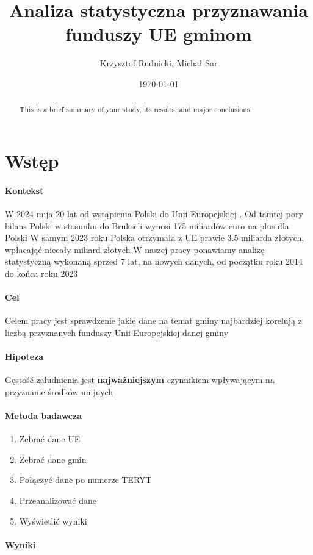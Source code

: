 \documentclass[12pt]{article}
\title{Analiza statystyczna przyznawania funduszy UE gminom}
\author{Krzysztof Rudnicki, Michał Sar}
\date{\today}
\begin{document}
\maketitle

\tableofcontents

\begin{abstract}
    This is a brief summary of your study, its results, and major conclusions.
\end{abstract}


\section{Wstęp}
\paragraph{Kontekst}
W 2024 mija 20 lat od wstąpienia Polski do Unii Europejskiej \cite{1}. 
Od tamtej pory bilans Polski w stosunku do Brukseli wynosi 175 miliardów euro na 
plus dla Polski \cite{2} W samym 2023 roku Polska otrzymała z UE prawie 3.5 miliarda 
złotych, wpłacająć niecały miliard złotych \cite{3} W naszej pracy ponawiamy analizę 
statystyczną wykonaną sprzed 7 lat, na nowych danych, od początku roku 2014 do końca 
roku 2023
\paragraph{Cel}
Celem pracy jest sprawdzenie jakie dane na temat gminy najbardziej korelują z liczbą 
przyznanych funduszy Unii Europejskiej danej gminy
\paragraph{Hipoteza} 
\ul{Gęstość zaludnienia jest \textbf{najważniejszym} czynnikiem wpływającym na 
przyznanie środków unijnych} \\
\paragraph{Metoda badawcza}
\begin{enumerate}
    \item Zebrać dane UE
    \item Zebrać dane gmin
    \item Połączyć dane po numerze TERYT
    \item Przeanalizować dane 
    \item Wyświetlić wyniki
\end{enumerate}
\paragraph{Wyniki}
\end{document}
